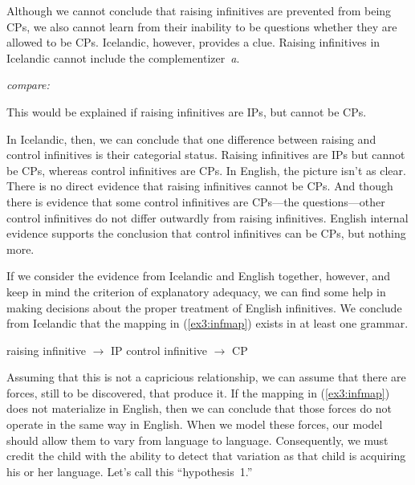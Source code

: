 Although we cannot conclude that raising infinitives are prevented from being CPs, we also cannot learn from their inability to be questions whether they are allowed to be CPs. Icelandic, however, provides a clue. Raising infinitives in Icelandic cannot include the complementizer~\emph{a{\dh}}.
\begin{exe}
\sn \emph{compare:}
\end{exe}
This would be explained if raising infinitives are IPs, but cannot be CPs.

In Icelandic, then, we can conclude that one difference between raising and control infinitives is their categorial status. Raising infinitives are IPs but cannot be CPs, whereas control infinitives are CPs. In English, the picture isn't as clear. There is no direct evidence that raising infinitives cannot be CPs. And though there is evidence that some control infinitives are CPs---the questions---other control infinitives do not differ outwardly from raising infinitives. English internal evidence supports the conclusion that control infinitives can be CPs, but nothing more.

If we consider the evidence from Icelandic and English together, however, and keep in mind the criterion of explanatory adequacy, we can find some help in making decisions about the proper treatment of English infinitives. We conclude from Icelandic that the mapping in (\ref{ex3:infmap}) exists in at least one grammar.
\begin{exe}
\ex \label{ex3:infmap} 
\begin{xlist}
	\sn raising infinitive $\rightarrow$ IP
	\sn control infinitive $\rightarrow$ CP
\end{xlist}
\end{exe}
Assuming that this is not a capricious relationship, we can assume that there are forces, still to be discovered, that produce it. If the mapping in (\ref{ex3:infmap}) does not materialize in English, then we can conclude that those forces do not operate in the same way in English. When we model these forces, our model should allow them to vary from language to language. Consequently, we must credit the child with the ability to detect that variation as that child is acquiring his or her language. Let's call this ``hypothesis~1.''

